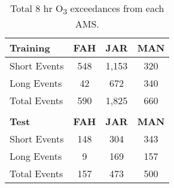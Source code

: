 \begin{table}[H]
\centering
\caption{Total 8 hr O\textsubscript{3} exceedances from each AMS.}
\label{tb:AMSexceedances}
\begin{tabular}{@{}lccc@{}}
\toprule
\textbf{Training} & \textbf{FAH} & \textbf{JAR} & \textbf{MAN} \\ \midrule
Short Events      & 548          & 1,153        & 320          \\
Long Events       & 42           & 672          & 340          \\
Total Events      & 590          & 1,825        & 660          \\
                  &              &              &              \\ \midrule
\textbf{Test}     & \textbf{FAH} & \textbf{JAR} & \textbf{MAN} \\ \midrule
Short Events      & 148          & 304          & 343          \\
Long Events       & 9            & 169          & 157          \\
Total Events      & 157          & 473          & 500          \\ \bottomrule
\end{tabular}
\end{table}